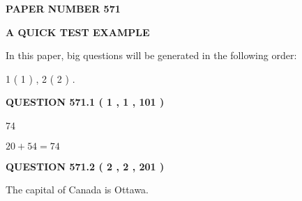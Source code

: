 \documentclass[12pt]{article}
\begin{document}
   
   
   
\newpage 
\setcounter{page}{ 
   571001 } 
   
   
   
   
 {\textbf{ \Large{ PAPER NUMBER  571  }}}
   
   
\vspace{0.2in}
   
   
   
   
   
   
 \vspace{0.2in}
{\LARGE {\textbf{ A QUICK TEST EXAMPLE}}}
   
   
   
\vspace{0.2in}
   
In this paper, big questions will be generated in the following order: 
   
   
   1 ( 1 )
 ,
   2 ( 2 )
 .
  
\vspace{0.2in}
  
{\textbf{\Large{QUESTION
571.1 
 ( 1 , 1 , 101 )
}}}
  
  
 
 
\noindent{}

74
 
 
 
 
\noindent{}

$ %
20 +  %
54=   %
74$
 
 
  
\vspace{0.2in}
  
{\textbf{\Large{QUESTION
571.2 
 ( 2 , 2 , 201 )
}}}
  
  
 
 
\noindent{}
 
 
The capital of Canada is Ottawa.
 
 
 
 
   
   
 \vspace{0.2in}
 
   
   
   
   
\end{document}
